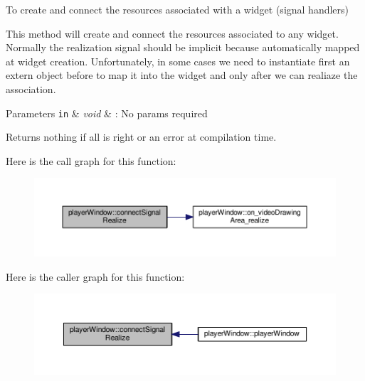 To create and connect the resources associated with a widget (signal handlers) 

This method will create and connect the resources associated to any widget. Normally the realization signal should be implicit because automatically mapped at widget creation. Unfortunately, in some cases we need to instantiate first an extern object before to map it into the widget and only after we can realiaze the association. 
\begin{DoxyParams}[1]{Parameters}
\mbox{\tt in}  & {\em void} & \-: No params required \\
\hline
\end{DoxyParams}
\begin{DoxyReturn}{Returns}
nothing if all is right or an error at compilation time. 
\end{DoxyReturn}


Here is the call graph for this function\-:\nopagebreak
\begin{figure}[H]
\begin{center}
\leavevmode
\includegraphics[width=350pt]{classplayerWindow_a04c0d0ccc64d561bf455c45f0bf37027_cgraph}
\end{center}
\end{figure}




Here is the caller graph for this function\-:\nopagebreak
\begin{figure}[H]
\begin{center}
\leavevmode
\includegraphics[width=350pt]{classplayerWindow_a04c0d0ccc64d561bf455c45f0bf37027_icgraph}
\end{center}
\end{figure}


